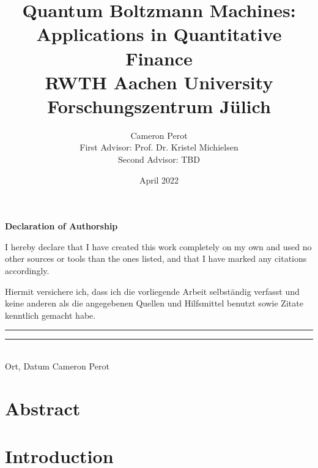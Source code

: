 \documentclass[12pt,twoside]{report}
\title{
    {Quantum Boltzmann Machines: Applications in Quantitative Finance}\\
    \vspace{0.5cm}
    {\large RWTH Aachen University}\\
    {\large Forschungszentrum J\"ulich}
}
\author{
    {Cameron Perot}\\
    {First Advisor: Prof. Dr. Kristel Michielsen}\\
    {Second Advisor: TBD}
}
\date{April 2022}
\begin{document}
\maketitle
{}

\clearpage\shipout\null
\begin{center}
\bf{Declaration of Authorship}
\end{center}

I hereby declare that I have created this work completely on my own and used no other sources or tools than the ones listed, and that I have marked any citations accordingly.

Hiermit versichere ich, dass ich die vorliegende Arbeit selbst\"andig verfasst und keine anderen als die angegebenen Quellen und Hilfsmittel benutzt sowie Zitate kenntlich gemacht habe. \\

\vspace{1.2cm}
\noindent \rule{5cm}{0.15mm} \hfill \rule{5cm}{0.15mm}\\
\noindent Ort, Datum \hfill Cameron Perot

\clearpage\shipout\null
\chapter*{Abstract}

\tableofcontents

\chapter{Introduction}
\label{ch:introduction}


\end{document}
